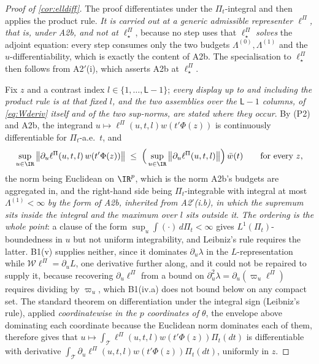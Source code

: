 \begin{proof}[Proof of \cref{cor:elldiff}]
The proof differentiates under the $\Pi_t$-integral and then applies the product rule.
\emph{It is carried out at a generic admissible representer $\ell^\Pi$, that is, under A2b, and
not at $\ell^\Pi_\star$}, because no step uses that $\ell^\Pi_\star$ \emph{solves} the adjoint equation:
every step consumes only the two budgets $\Lambda^{(0)},\Lambda^{(1)}$ and the $u$-differentiability,
which is exactly the content of A2b. The specialisation to $\ell^\Pi_\star$ then follows from A2$'$(i),
which asserts A2b at $\ell^\Pi_\star$.

Fix $z$ and a contrast index $l\in\{1,\dots,\mathsf L-1\}$; \emph{every display up to and including the
product rule is at that fixed $l$, and the two assemblies over the $\mathsf L-1$ columns, of
\eqref{eq:Wderiv} itself and of the two sup-norms, are stated where they occur}. By (P2) and A2b, the
integrand $u\mapsto\ell^\Pi(u,t,l)w(t'\Phi(z))$ is
continuously differentiable for $\Pi_t$-a.e.\ $t$, and
\[
\sup_{u\in\IR}\big\|\partial_u\ell^\Pi(u,t,l)\,w(t'\Phi(z))\big\|\;\le\;
\Big(\sup_{u\in\IR}\big\|\partial_u\ell^\Pi(u,t,l)\big\|\Big)\,\bar w(t)
\qquad\text{for every }z ,
\]
the norm being Euclidean on $\IR^{p}$, which is the norm A2b's budgets are aggregated in, and the
right-hand side being $\Pi_t$-integrable with integral at most $\Lambda^{(1)}<\infty$ \emph{by the
form of A2b, inherited from A2$'$(i.b), in which the supremum sits inside the integral and the maximum
over $l$ sits outside it}. \emph{The
ordering is the whole point}: a clause of the form $\sup_u\int(\cdot)\,d\Pi_t<\infty$ gives
$L^{1}(\Pi_t)$-boundedness in $u$
but not uniform integrability, and Leibniz's rule requires the latter. B1(v) supplies neither, since it
dominates $\partial_u\lambda$ in the $L$-representation while $\mathcal W\ell^\Pi=\partial_uL$,
one derivative further along, and it could not be repaired to supply it, because recovering
$\partial_u\ell^\Pi$ from a bound on $\partial_u^{2}\lambda=\partial_u(\varpi_u\ell^\Pi)$ requires
dividing by $\varpi_u$, which B1(iv.a) does not bound below on any compact set. The standard theorem on
differentiation under the integral sign (Leibniz's rule), applied \emph{coordinatewise in the $p$
coordinates of $\theta$}, the envelope above dominating each coordinate because the Euclidean norm
dominates each of them, therefore gives that
$u\mapsto\int_{\mathcal T}\ell^\Pi(u,t,l)w(t'\Phi(z))\Pi_t(dt)$ is differentiable with
derivative $\int_{\mathcal T}\partial_u\ell^\Pi(u,t,l)w(t'\Phi(z))\Pi_t(dt)$, uniformly in $z$.


\end{proof}
